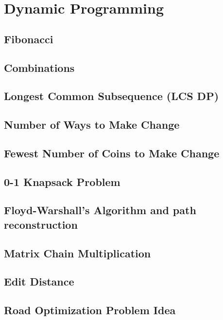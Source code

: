 \section{Dynamic Programming}
\subsection*{Fibonacci}
\lipsum[1][1-2]
\subsection*{Combinations}
\lipsum[1][1-2]
\subsection*{Longest Common Subsequence (LCS DP)}
\lipsum[1][1-2]
\subsection*{Number of Ways to Make Change}
\lipsum[1][1-2]
\subsection*{Fewest Number of Coins to Make Change}
\lipsum[1][1-2]
\subsection*{0-1 Knapsack Problem}
\lipsum[1][1-2]
\subsection*{Floyd-Warshall's Algorithm and path reconstruction}
\lipsum[1][1-2]
\subsection*{Matrix Chain Multiplication}
\lipsum[1][1-2]
\subsection*{Edit Distance}
\lipsum[1][1-2]
\subsection*{Road Optimization Problem Idea}
\lipsum[1][1-2]
